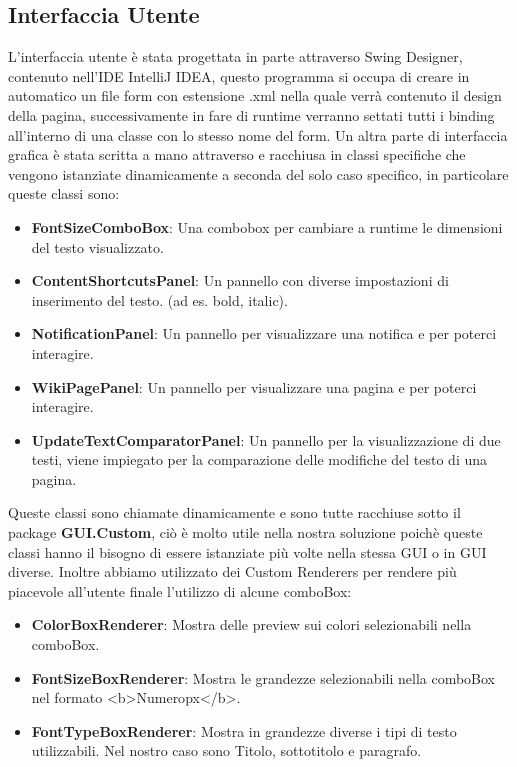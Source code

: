 \documentclass{article}
\begin{document}
	\subsection{Interfaccia Utente}
	L'interfaccia utente \`e stata progettata in parte attraverso Swing Designer, contenuto nell'IDE IntelliJ IDEA, questo programma si occupa di creare in automatico un file form con estensione .xml nella quale verrà contenuto il design della pagina, successivamente in fare di runtime verranno settati tutti i binding all'interno di una classe con lo stesso nome del form. 
	Un altra parte di interfaccia grafica è stata scritta a mano attraverso e racchiusa in classi specifiche che vengono istanziate dinamicamente a seconda del solo caso specifico, in particolare queste classi sono:
	\begin{itemize}
		\item \textbf{FontSizeComboBox}: Una combobox per cambiare a runtime le dimensioni del testo visualizzato.
		\item \textbf{ContentShortcutsPanel}: Un pannello con diverse impostazioni di inserimento del testo. (ad es. bold, italic).
		\item \textbf{NotificationPanel}: Un pannello per visualizzare una notifica e per poterci interagire.
		\item \textbf{WikiPagePanel}: Un pannello per visualizzare una pagina e per poterci interagire.
		\item \textbf{UpdateTextComparatorPanel}: Un pannello per la visualizzazione di due testi, viene impiegato per la comparazione delle modifiche del testo di una pagina.
	\end{itemize}
	
	Queste classi sono chiamate dinamicamente e sono tutte racchiuse sotto il package \textbf{GUI.Custom}, ciò è molto utile nella nostra soluzione poichè queste classi hanno il bisogno di essere istanziate più volte nella stessa GUI o in GUI diverse. 
	Inoltre abbiamo utilizzato dei Custom Renderers per rendere più piacevole all'utente finale l'utilizzo di alcune comboBox:
	\begin{itemize}
		\item \textbf{ColorBoxRenderer}: Mostra delle preview sui colori selezionabili nella comboBox.
		\item \textbf{FontSizeBoxRenderer}: Mostra le grandezze selezionabili nella comboBox nel formato <b>{Numero}px</b>.
		\item \textbf{FontTypeBoxRenderer}: Mostra in grandezze diverse i tipi di testo utilizzabili. Nel nostro caso sono Titolo, sottotitolo e paragrafo.
	\end{itemize}
	
\end{document}
